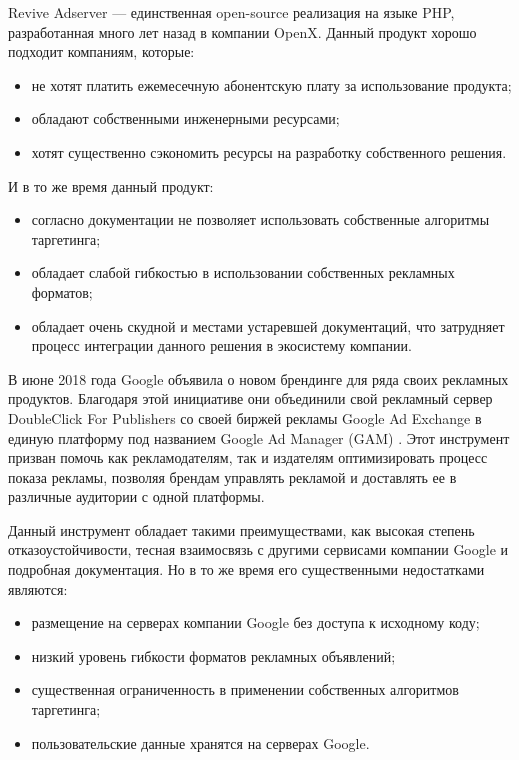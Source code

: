 \documentclass[specification,annotation,times]{itmo-student-thesis}
\begin{document}
Revive Adserver \cite{revive-adserver} — единственная open-source реализация на языке PHP, разработанная много лет назад в компании OpenX. Данный продукт хорошо подходит компаниям, которые:
\begin{itemize}
\item не хотят платить ежемесечную абонентскую плату за использование продукта;
\item обладают собственными инженерными ресурсами;
\item хотят существенно сэкономить ресурсы на разработку собственного решения.
\end{itemize}
И в то же время данный продукт:
\begin{itemize}
\item согласно документации не позволяет использовать собственные алгоритмы таргетинга;
\item обладает слабой гибкостью в использовании собственных рекламных форматов;
\item обладает очень скудной и местами устаревшей документаций, что затрудняет процесс интеграции данного решения в экосистему компании.
\end{itemize}


В июне 2018 года Google объявила о новом брендинге для ряда своих рекламных продуктов. Благодаря этой инициативе они объединили свой рекламный сервер DoubleClick For Publishers со своей биржей рекламы Google Ad Exchange в единую платформу под названием Google Ad Manager (GAM) \cite{google-ad-manager}. Этот инструмент призван помочь как рекламодателям, так и издателям оптимизировать процесс показа рекламы, позволяя брендам управлять рекламой и доставлять ее в различные аудитории с одной платформы. 

Данный инструмент обладает такими преимуществами, как высокая степень отказоустойчивости, тесная взаимосвязь с другими сервисами компании Google и подробная документация. Но в то же время его существенными недостатками являются:
\begin{itemize}
\item размещение на серверах компании Google без доступа к исходному коду;
\item низкий уровень гибкости форматов рекламных объявлений;
\item существенная ограниченность в применении собственных алгоритмов таргетинга;
\item пользовательские данные хранятся на серверах Google.
\end{itemize}
\end{document}
